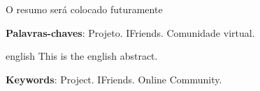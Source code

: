 
\setlength{\absparsep}{18pt} %
\begin{resumo}

O resumo será colocado futuramente


\textbf{Palavras-chaves}: Projeto. IFriends. Comunidade virtual.
\end{resumo}

\begin{resumo}[Abstract]
\begin{otherlanguage*}{english}
  This is the english abstract.

  \vspace{\onelineskip}
  \noindent 
  \textbf{Keywords}: Project. IFriends. Online Community.
 \end{otherlanguage*}
\end{resumo}
